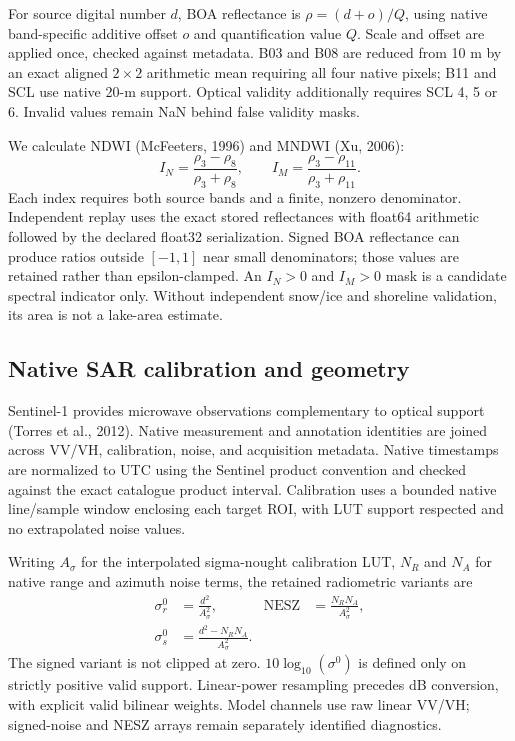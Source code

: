 \documentclass[10pt,twocolumn]{article}
\begin{document}
For source digital number $d$, BOA reflectance is $\rho=(d+o)/Q$, using native band-specific additive offset $o$ and quantification value $Q$. Scale and offset are applied once, checked against metadata. B03 and B08 are reduced from 10 m by an exact aligned $2\times2$ arithmetic mean requiring all four native pixels; B11 and SCL use native 20-m support. Optical validity additionally requires SCL 4, 5 or 6. Invalid values remain NaN behind false validity masks.

We calculate NDWI (McFeeters, 1996) and MNDWI (Xu, 2006):
\begin{equation}
 I_N=\frac{\rho_3-\rho_8}{\rho_3+\rho_8},\qquad
 I_M=\frac{\rho_3-\rho_{11}}{\rho_3+\rho_{11}}.
\end{equation}
Each index requires both source bands and a finite, nonzero denominator. Independent replay uses the exact stored reflectances with float64 arithmetic followed by the declared float32 serialization. Signed BOA reflectance can produce ratios outside $[-1,1]$ near small denominators; those values are retained rather than epsilon-clamped. An $I_N>0$ and $I_M>0$ mask is a candidate spectral indicator only. Without independent snow/ice and shoreline validation, its area is not a lake-area estimate.

\subsection{Native SAR calibration and geometry}
Sentinel-1 provides microwave observations complementary to optical support (Torres et al., 2012). Native measurement and annotation identities are joined across VV/VH, calibration, noise, and acquisition metadata. Native timestamps are normalized to UTC using the Sentinel product convention and checked against the exact catalogue product interval. Calibration uses a bounded native line/sample window enclosing each target ROI, with LUT support respected and no extrapolated noise values.

Writing $A_\sigma$ for the interpolated sigma-nought calibration LUT, $N_R$ and $N_A$ for native range and azimuth noise terms, the retained radiometric variants are
\begin{align}
 \sigma^0_{r}&=\frac{d^2}{A_\sigma^2},&
 \mathrm{NESZ}&=\frac{N_RN_A}{A_\sigma^2},\\
 \sigma^0_{s}&=\frac{d^2-N_RN_A}{A_\sigma^2}.
\end{align}
The signed variant is not clipped at zero. $10\log_{10}(\sigma^0)$ is defined only on strictly positive valid support. Linear-power resampling precedes dB conversion, with explicit valid bilinear weights. Model channels use raw linear VV/VH; signed-noise and NESZ arrays remain separately identified diagnostics.
\end{document}
